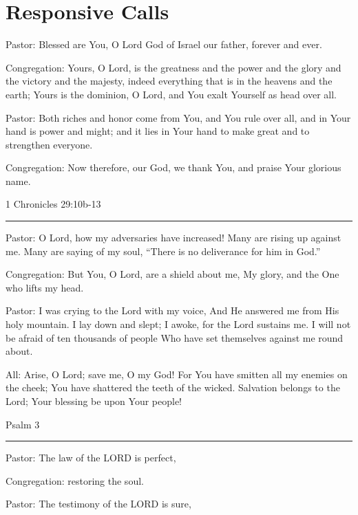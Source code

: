 \documentclass[]{book}
\begin{document}
\section*{Responsive Calls}\label{responsive-calls}

Pastor: Blessed are You, O Lord God of Israel our father, forever and
ever.

Congregation: Yours, O Lord, is the greatness and the power and the
glory and the victory and the majesty, indeed everything that is in the
heavens and the earth; Yours is the dominion, O Lord, and You exalt
Yourself as head over all.

Pastor: Both riches and honor come from You, and You rule over all, and
in Your hand is power and might; and it lies in Your hand to make great
and to strengthen everyone.

Congregation: Now therefore, our God, we thank You, and praise Your
glorious name.

1 Chronicles 29:10b-13 \textbar{}

\begin{center}\rule{0.5\linewidth}{\linethickness}\end{center}

Pastor: O Lord, how my adversaries have increased! Many are rising up
against me. Many are saying of my soul, ``There is no deliverance for
him in God.''

Congregation: But You, O Lord, are a shield about me, My glory, and the
One who lifts my head.

Pastor: I was crying to the Lord with my voice, And He answered me from
His holy mountain. I lay down and slept; I awoke, for the Lord sustains
me. I will not be afraid of ten thousands of people Who have set
themselves against me round about.

All: Arise, O Lord; save me, O my God! For You have smitten all my
enemies on the cheek; You have shattered the teeth of the wicked.
Salvation belongs to the Lord; Your blessing be upon Your people!

Psalm 3 \textbar{}

\begin{center}\rule{0.5\linewidth}{\linethickness}\end{center}

Pastor: The law of the LORD is perfect,

Congregation: restoring the soul.

Pastor: The testimony of the LORD is sure,
\end{document}

